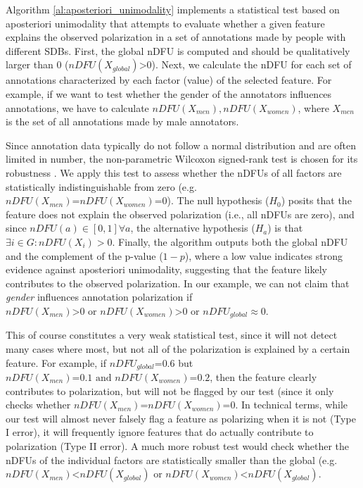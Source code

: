 Algorithm \ref{al:aposteriori_unimodality} implements a statistical test based on aposteriori unimodality that attempts to evaluate whether a given feature explains the observed polarization in a set of annotations made by people with different \acp{SDB}. First, the global \ac{nDFU} is computed and should be qualitatively larger than $0$ ($nDFU(X_{global}) \text{>} 0$). Next, we calculate the \ac{nDFU} for each set of annotations characterized by each factor (value) of the selected feature. For example, if we want to test whether the gender of the annotators influences annotations, we have to calculate $nDFU(X_{men}), nDFU(X_{women})$, where $X_{men}$ is the set of all annotations made by male annotators. 

Since annotation data typically do not follow a normal distribution and are often limited in number, the non-parametric Wilcoxon signed-rank test is chosen for its robustness \cite{Rey2011}. We apply this test to assess whether the \acp{nDFU} of all factors are statistically indistinguishable from zero (e.g. $nDFU(X_{men}) \text{=} nDFU(X_{women}) \text{=} 0$). The null hypothesis ($H_0$) posits that the feature does not explain the observed polarization (i.e., all \acp{nDFU} are zero), and since $nDFU(a) \in [0,1] \forall a$, the alternative hypothesis ($H_a$) is that $\exists i \in G: nDFU(X_i) > 0$. Finally, the algorithm outputs both the global \ac{nDFU} and the complement of the p-value ($1 - p$), where a low value indicates strong evidence against aposteriori unimodality, suggesting that the feature likely contributes to the observed polarization. In our example, we can not claim that \textit{gender} influences annotation polarization if $nDFU(X_{men}) \text{>} 0 \text{ or } nDFU(X_{women}) \text{>} 0 \text{ or } nDFU_{global} \approx 0$.

This of course constitutes a very weak statistical test, since it will not detect many cases where most, but not all of the polarization is explained by a certain feature. For example, if $nDFU_{global} \text{=} 0.6$ but  $nDFU(X_{men}) \text{=} 0.1 \text{ and } nDFU(X_{women}) \text{=} 0.2$, then the feature clearly contributes to polarization, but will not be flagged by our test (since it only checks whether $nDFU(X_{men}) \text{=} nDFU(X_{women}) \text{=} 0$. In technical terms, while our test will almost never falsely flag a feature as polarizing when it is not (Type I error), it will frequently ignore features that do actually contribute to polarization (Type II error). A much more robust test would check whether the \acp{nDFU} of the individual factors are statistically smaller than the global (e.g. $nDFU(X_{men}) \text{<} nDFU(X_{global}) \text{ or } nDFU(X_{women}) \text{<} nDFU(X_{global})$.

